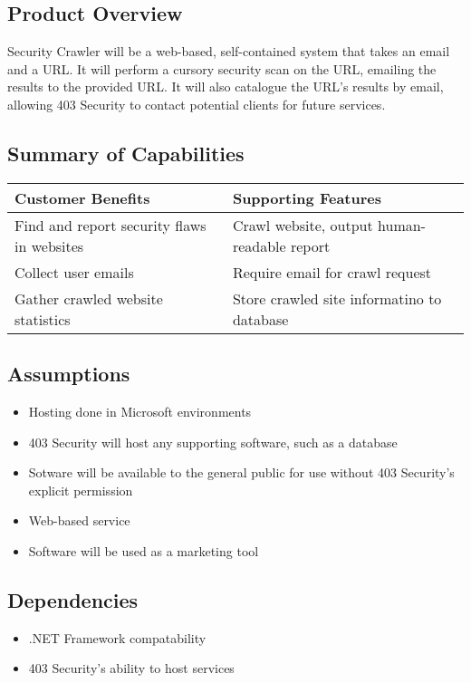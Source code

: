 \subsection{Product Overview}

Security Crawler will be a web-based, self-contained system that takes an email and a URL.  It will perform a cursory security scan on the URL, emailing the results to the provided URL.  It will also catalogue the URL's results by email, allowing 403 Security to contact potential clients for future services.

\subsection{Summary of Capabilities}
\begin{tabularx}{\textwidth}{|X|X|}
    \hline
    {\bf Customer Benefits} & {\bf Supporting Features} \\ \hline
    Find and report security flaws in websites & Crawl website, output human-readable report \\ \hline
    Collect user emails & Require email for crawl request \\ \hline
    Gather crawled website statistics & Store crawled site informatino to database \\ \hline 
\end{tabularx}

\subsection{Assumptions}
\begin{itemize}
    \item Hosting done in Microsoft environments
    \item 403 Security will host any supporting software, such as a database
    \item Sotware will be available to the general public for use without 403 Security's explicit permission
    \item Web-based service
    \item Software will be used as a marketing tool
\end{itemize}

\subsection{Dependencies}
\begin{itemize}
    \item .NET Framework compatability
    \item 403 Security's ability to host services
\end{itemize}

